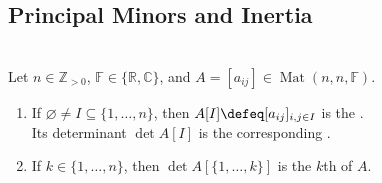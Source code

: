 \subsection{Principal Minors and Inertia}

\begin{definition} \label{def:principal-and-leading-principal-minors} \\
Let $n\in\mathbb{Z}_{>0}$, $\mathbb{F}\in\{\mathbb{R},\mathbb{C}\}$, and $A=[a_{ij}]\in\operatorname{Mat}(n,n,\mathbb{F})$.
\begin{enumerate}[label=(\roman*)]
\setlength{\itemsep}{0pt}
\item If $\varnothing\neq I\subseteq\{1,\ldots,n\}$, then $A[I]\defeq[a_{ij}]_{i,j\in I}$ is the .\\
Its determinant $\det A[I]$ is the corresponding .
\item If $k\in\{1,\ldots,n\}$, then $\det A[\{1,\ldots,k\}]$ is the $k$th  of $A$.
\end{enumerate}
\end{definition}

